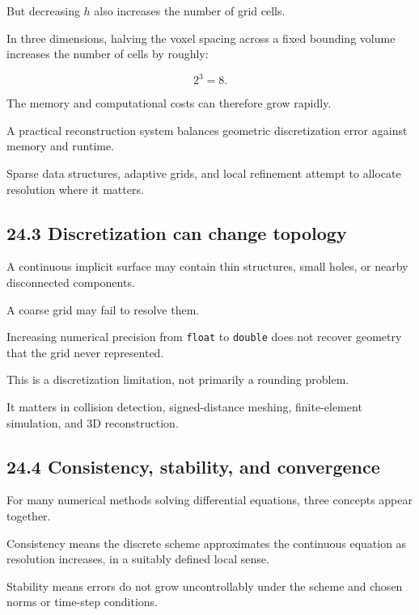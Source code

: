 But decreasing \(h\) also increases the number of grid cells.

In three dimensions, halving the voxel spacing across a fixed bounding volume increases the number of cells by roughly:

\[ 2^3=8. \]

The memory and computational costs can therefore grow rapidly.

A practical reconstruction system balances geometric discretization error against memory and runtime.

Sparse data structures, adaptive grids, and local refinement attempt to allocate resolution where it matters.

\subsection{24.3 Discretization can change topology}\label{02-foundations-ii-ch029-discretization-can-change-topology}

\hypertarget{02-foundations-ii-ch029-discretization-can-change-topology}{}

A continuous implicit surface may contain thin structures, small holes, or nearby disconnected components.

A coarse grid may fail to resolve them.

Increasing numerical precision from \texttt{float} to \texttt{double} does not recover geometry that the grid never represented.

This is a discretization limitation, not primarily a rounding problem.

It matters in collision detection, signed-distance meshing, finite-element simulation, and 3D reconstruction.

\subsection{24.4 Consistency, stability, and convergence}\label{02-foundations-ii-ch029-consistency-stability-and-convergence}

\hypertarget{02-foundations-ii-ch029-consistency-stability-and-convergence}{}

For many numerical methods solving differential equations, three concepts appear together.

Consistency means the discrete scheme approximates the continuous equation as resolution increases, in a suitably defined local sense.

Stability means errors do not grow uncontrollably under the scheme and chosen norms or time-step conditions.

